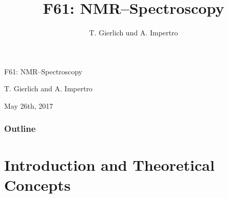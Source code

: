 \documentclass[aspectratio=169]{beamer}
\title{F61: NMR--Spectroscopy}
\author{T. Gierlich und A. Impertro}
\date{}
\begin{document}
\begin{frame}
  \begin{center}
    {\LARGE F61: NMR--Spectroscopy}
    
    \bigskip
    
    {\large T. Gierlich and A. Impertro}
        
    \bigskip
   
    {\large May 26th, 2017}
  \end{center}
\end{frame}

\begin{frame}
	\frametitle{Outline}
  	\tableofcontents[subsubsectionstyle=hide]
\end{frame}

\section{Introduction and Theoretical Concepts}
\end{document}

